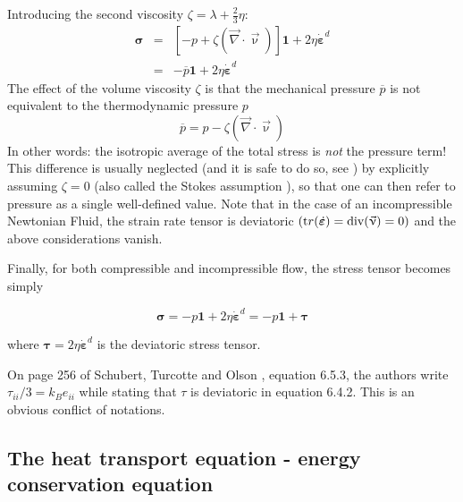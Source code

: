Introducing the second viscosity $\zeta=\lambda+\frac{2}{3}\eta$:
\begin{eqnarray}
{\bm \sigma} 
&=& \left[ -p+ \zeta (\vec\nabla\cdot\vec\upnu)\right] {\bm 1} + 2\eta  \dot{\bm \varepsilon}^d \\ 
&=&  -\overline{p} {\bm 1} + 2\eta  \dot{\bm \varepsilon}^d  
\end{eqnarray}
The effect of the volume viscosity $\zeta$ is that the mechanical pressure $\overline{p}$
is not equivalent to the thermodynamic pressure $p$ 
\begin{equation}
\overline{p}=p - \zeta (\vec\nabla\cdot\vec\upnu)
\end{equation}
In other words: the isotropic average of the total stress is {\sl not} the pressure term!
This difference is usually neglected (and it is safe to do so, see \cite[section 7.02.3.2.2]{berc09}) 
by explicitly assuming $\zeta=0$ (also called the Stokes assumption \cite[p256]{scto01}), 
so that one can then refer to pressure as a single well-defined value.
Note that in the case of an incompressible Newtonian Fluid, 
the strain rate tensor is deviatoric $({\text tr}(\dot{\bm \varepsilon}) = \text{div}(\vec\upnu) =0)$ and the above considerations vanish.

Finally, for both compressible and incompressible flow, the stress tensor becomes simply
\begin{mdframed}[backgroundcolor=blue!5]
\begin{equation}
{\bm \sigma}=-p {\bm 1} + 2\eta \dot{\bm \varepsilon}^d = -p {\bm 1} + {\bm \tau}
\end{equation}
\end{mdframed}
where ${\bm \tau} = 2\eta \dot{\bm \varepsilon}^d$ is the deviatoric stress tensor.

\begin{remark}
On page 256 of Schubert, Turcotte and Olson \cite{scto01}, equation 6.5.3, the authors write $\tau_{ii}/3=k_B e_{ii}$ while stating that $\tau$ is deviatoric in equation 6.4.2. 
This is an obvious conflict of notations. 
\end{remark}

\subsection{The heat transport equation - energy conservation equation \label{ss:hte}}

